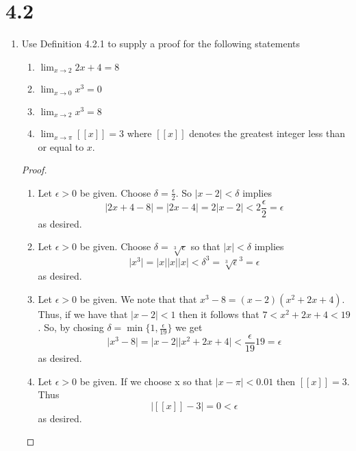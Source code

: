\section*{4.2}
\begin{enumerate}
    \item Use Definition 4.2.1 to supply a proof for the following statements
    \begin{enumerate}
        \item \( \lim_{x\rightarrow 2} 2x+4=8 \)
        
        \item \( \lim_{x \rightarrow 0} x^{3} = 0 \)
        
        \item \( \lim_{x \rightarrow 2} x^{3} = 8 \)
        
        \item \( \lim_{x \rightarrow \pi} [[x]] = 3 \) where \( [[x]] \) denotes the greatest integer less than or equal to \( x \). 
    \end{enumerate}
    \begin{proof}
    \begin{enumerate}
        \item Let \( \epsilon > 0 \) be given. Choose \( \delta = \frac{\epsilon}{2} \). So \( \vert x - 2 \vert < \delta \) implies
        \[
            \vert 2x+4-8 \vert = \vert 2x -4 \vert = 2 \vert x - 2 \vert < 2 \frac{\epsilon}{2} = \epsilon
        \]
        as desired.
    
    \item Let \( \epsilon > 0 \) be given. Choose \( \delta = \sqrt[3]{\epsilon} \) so that \( \vert x \vert < \delta \) implies
    \[
    \vert x^{3} \vert = \vert x \vert \vert x \vert \vert x \vert < \delta^{3} = \sqrt[3]{\epsilon}^{3} = \epsilon
    \]
    as desired.
    
    \item Let \( \epsilon > 0 \) be given. We note that that \( x^{3} - 8 = (x-2)(x^{2}+2x+4) \). Thus, if we have that \( \vert x - 2 \vert < 1 \) then it follows that \( 7 < x^{2}+2x+4 < 19 \). So, by chosing \( \delta = \min\{ 1, \frac{\epsilon}{19} \} \) we get
    \[
    \vert x^{3} - 8 \vert = \vert x-2 \vert \vert x^{2} + 2x+4 \vert < \frac{\epsilon}{19} 19 = \epsilon
    \]
    as desired.
    
    \item Let \( \epsilon > 0 \) be given. If we choose x so that \( \vert x - \pi \vert < 0.01 \) then \( [[x]] = 3 \). Thus
    \[
    \vert [[x]] - 3 \vert = 0 < \epsilon
    \]
    as desired.
    \end{enumerate}
    \end{proof}
    

\end{enumerate}
